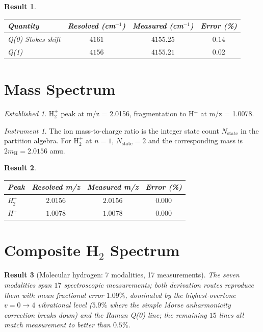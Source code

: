 \documentclass[11pt,a4paper]{article}
\theoremstyle{stmtstyle}
\newtheorem{result}{Result}
\theoremstyle{definition}
\theoremstyle{remark}
\newtheorem*{established}{Established}
\newtheorem*{instrument}{Instrument}
\begin{document}
\begin{result}\label{res:h2raman}
\begin{center}\small
\begin{tabular}{lccc}
\toprule
Quantity & Resolved (cm$^{-1}$) & Measured (cm$^{-1}$) & Error (\%)\\
\midrule
Q(0) Stokes shift & $4161$ & $4155.25$ & $0.14$\\
Q(1)              & $4156$ & $4155.21$ & $0.02$\\
\bottomrule
\end{tabular}
\end{center}
\end{result}

\section{Mass Spectrum}
\label{sec:h2ms}

\begin{established}
H$_{2}^{+}$ peak at m/z = 2.0156, fragmentation to H$^{+}$ at m/z = 1.0078.
\end{established}

\begin{instrument}
The ion mass-to-charge ratio is the integer state count $N_{\mathrm{state}}$ in the partition algebra. For H$_{2}^{+}$ at $n=1$, $N_{\mathrm{state}} = 2$ and the corresponding mass is $2 m_{\mathrm{H}} = 2.0156$ amu.
\end{instrument}

\begin{result}\label{res:h2ms}
\begin{center}\small
\begin{tabular}{lccc}
\toprule
Peak & Resolved m/z & Measured m/z & Error (\%)\\
\midrule
H$_{2}^{+}$ & $2.0156$ & $2.0156$ & $0.000$\\
H$^{+}$     & $1.0078$ & $1.0078$ & $0.000$\\
\bottomrule
\end{tabular}
\end{center}
\end{result}

\section{Composite H$_{2}$ Spectrum}
\label{sec:h2composite}

\begin{result}[Molecular hydrogen: 7 modalities, 17 measurements]\label{res:h2comp}
The seven modalities span $17$ spectroscopic measurements; both derivation routes reproduce them with mean fractional error $1.09\%$, dominated by the highest-overtone $v=0\to 4$ vibrational level ($5.9\%$ where the simple Morse anharmonicity correction breaks down) and the Raman Q(0) line; the remaining $15$ lines all match measurement to better than $0.5\%$.
\end{result}
\end{document}
